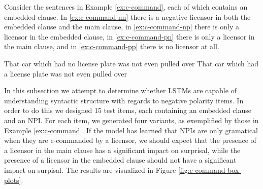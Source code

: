 \documentclass[11pt, round]{article}
\begin{document}
Consider the sentences in Example \ref{ex:c-command}, each of which contains an embedded clause. In \ref{ex:c-command-nn} there is a negative licensor in both the embedded clause and the main clause, in \ref{ex:c-command-np} there is only a licensor in the embedded clause, in \ref{ex:c-command-pn} there is only a licensor in the main clause, and in \ref{ex:c-command-pp} there is no licensor at all.

\begin{exe}
\ex
\label{ex:c-command}
\begin{xlist}
\ex \label{ex:c-command-nn} That car which had no license plate was not even pulled over
\ex \label{ex:c-command-pn} That car which had a license plate was not even pulled over
\end{xlist}
\end{exe}

In this subsection we attempt to determine whether LSTMs are capable of understanding syntactic structure with regards to negative polarity items. In order to do this we designed 15 test items, each containing an embedded clause and an NPI. For each item, we generated four variants, as exemplified by those in Example \ref{ex:c-command}. If the model has learned that NPIs are only gramatical when they are c-commanded by a licensor, we should expect that the presence of a licensor in the main clause has a significant impact on surprisal, while the presence of a licensor in the embedded clause should not have a significant impact on surpisal. The results are visualized in Figure \ref{fig:c-command-box-plots}.
\end{document}
